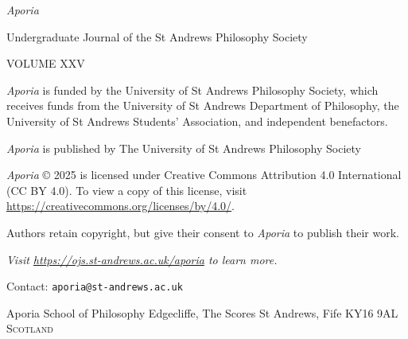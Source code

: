 \thispagestyle{empty}

\noindent
{\huge\textit{Aporia}}

\vspace{1cm}

\normalsize
\noindent Undergraduate Journal of the St Andrews Philosophy
Society

\vspace{1cm}
\noindent VOLUME XXV


\vspace{3cm}
\vfill

\noindent \textit{Aporia} is funded by the University of St
Andrews Philosophy Society, which receives funds from the
University of St Andrews
Department of Philosophy, the University of St Andrews
Students’ Association, and independent benefactors.

\noindent
\textit{Aporia} is published by The University of St Andrews
Philosophy Society

\vspace{1cm}
\noindent
\textit{Aporia} © 2025 is licensed under Creative Commons
Attribution 4.0 International (CC BY 4.0). To view a copy of
this license, visit
\url{https://creativecommons.org/licenses/by/4.0/}.

\vspace{1cm}
\noindent
Authors retain copyright, but give their consent to
\textit{Aporia} to publish their work.

\vspace{2cm}
\begin{multicols}{2}
\noindent
\large\textit{Visit \url{https://ojs.st-andrews.ac.uk/aporia} to learn more.}
\vspace{2cm}

\newline
Contact: \texttt{aporia@st-andrews.ac.uk}

\columnbreak
\noindent
Aporia\newline
School of Philosophy\newline
Edgecliffe, The Scores\newline
St Andrews, Fife\newline
KY16 9AL\newline
\textsc{Scotland}
\end{multicols}
